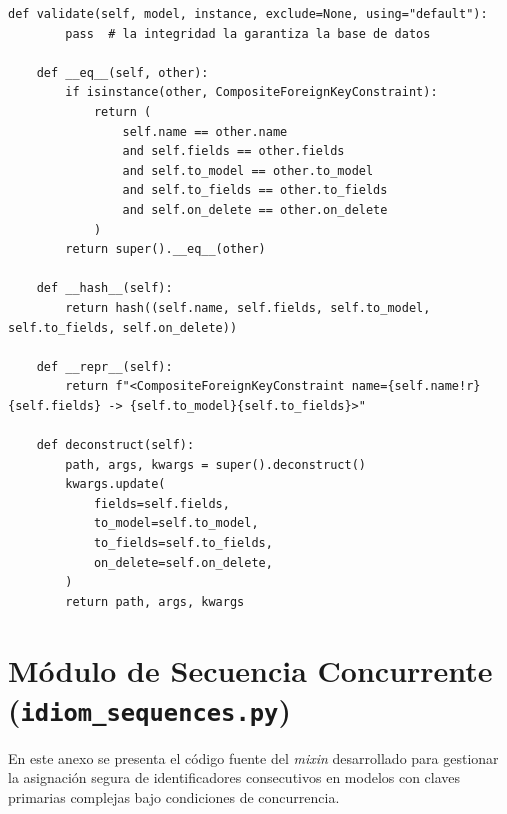 \begin{lstlisting}[caption={Implementación de CompositeForeignKeyConstraint para claves foráneas compuestas}, label={anx:code-idiom-constraints}]
    def validate(self, model, instance, exclude=None, using="default"):
        pass  # la integridad la garantiza la base de datos

    def __eq__(self, other):
        if isinstance(other, CompositeForeignKeyConstraint):
            return (
                self.name == other.name
                and self.fields == other.fields
                and self.to_model == other.to_model
                and self.to_fields == other.to_fields
                and self.on_delete == other.on_delete
            )
        return super().__eq__(other)

    def __hash__(self):
        return hash((self.name, self.fields, self.to_model, self.to_fields, self.on_delete))

    def __repr__(self):
        return f"<CompositeForeignKeyConstraint name={self.name!r} {self.fields} -> {self.to_model}{self.to_fields}>"

    def deconstruct(self):
        path, args, kwargs = super().deconstruct()
        kwargs.update(
            fields=self.fields,
            to_model=self.to_model,
            to_fields=self.to_fields,
            on_delete=self.on_delete,
        )
        return path, args, kwargs
\end{lstlisting}

\chapter{Módulo de Secuencia Concurrente (\texttt{idiom\_sequences.py})}
\label{anx:idiom-sequences}

En este anexo se presenta el código fuente del \textit{mixin} desarrollado para gestionar la asignación segura de identificadores consecutivos en modelos con claves primarias complejas bajo condiciones de concurrencia.

